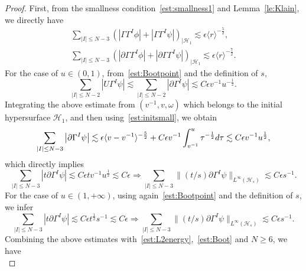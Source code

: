 \documentclass[10pt,a4paper]{amsart}
\def \d {{\rm{d}}}
\begin{document}
\begin{proof}
First, from the smallness condition~\eqref{est:smallness1} and Lemma~\ref{le:Klain}, we directly have 
\begin{equation}\label{est:initsmall}
\begin{aligned}
    \sum_{|I|\le N-3}\left(|\Gamma \Gamma^{I}\phi|+|\Gamma\Gamma^{I}\psi|\right)_{|\mathcal{H}_{1}}\lesssim \epsilon\langle r\rangle^{-\frac{5}{2}},\\
    \sum_{|I|\le N-3}
    \left(|\partial\Gamma \Gamma^{I}\phi|+|\partial\Gamma\Gamma^{I}\psi|\right)_{|\mathcal{H}_{1}}
    \lesssim \epsilon\langle r\rangle^{-\frac{7}{2}}.
    \end{aligned}
\end{equation}
For the case of $u\in (0,1)$, from~\eqref{est:Bootpoint} and the definition of $s$, 
\begin{equation*}
   \sum_{|I|\le N-2}
       \left|U\Gamma^{I}\psi\right|\lesssim  \sum_{|I|\le N-2}
       \left|\partial \Gamma^{I}\psi\right|\lesssim C\epsilon  v^{-1}u^{-\frac{1}{2}}.
\end{equation*}
Integrating the above estimate from $(v^{-1},v,\omega)$ which belongs to the initial hypersurface $\mathcal{H}_{1}$, and then using~\eqref{est:initsmall}, we obtain
\begin{equation}\label{est:localu}
    \sum_{|I|\le N-3}\left|\partial \Gamma^{I}\psi\right|\lesssim \epsilon\langle v-v^{-1}\rangle^{-\frac{5}{2}}+
    C\epsilon v^{-1}\int_{v^{-1}}^{u}\tau^{-\frac{1}{2}}\d \tau \lesssim 
    C\epsilon v^{-1}u^{\frac{1}{2}},
\end{equation}
which directly implies 
\begin{equation*}
    \sum_{|I|\le N-3}\left|t\partial \Gamma^{I}\psi\right|\lesssim C\epsilon tv^{-1}u^{\frac{1}{2}}\lesssim  C\epsilon \Longrightarrow 
    \sum_{|I|\le N-3}\|(t/s)\partial\Gamma^{I}\psi\|_{L^{\infty}(\mathcal{H}_{s})}\lesssim C\epsilon s^{-1}.
\end{equation*}
For the case of $u\in (1,+\infty)$, using again~\eqref{est:Bootpoint} and the definition of $s$, we infer
\begin{equation*}
    \sum_{|I|\le N-3}\left|t\partial \Gamma^{I}\psi\right|\lesssim C\epsilon t^{\frac{1}{2}}s^{-1}\lesssim  C\epsilon \Longrightarrow 
    \sum_{|I|\le N-3}\|(t/s)\partial\Gamma^{I}\psi\|_{L^{\infty}(\mathcal{H}_{s})}\lesssim C\epsilon s^{-1}.
\end{equation*}
Combining the above estimates with~\eqref{est:L2energy},~\eqref{est:Boot} and $N\ge 6$, we have 
\begin{equation*}

\end{equation*}
\end{proof}
\end{document}
